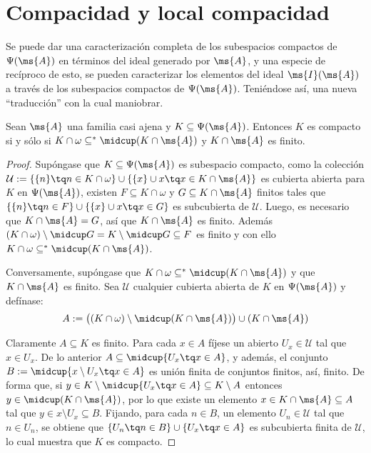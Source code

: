 	\section{Compacidad y local compacidad}
	
	Se puede dar una caracterización completa de los subespacios compactos de $\Psi(\ms{A})$ en términos del ideal generado por $\ms{A}$, y una especie de recíproco de esto, se pueden caracterizar los elementos del ideal $\ms{I}(\ms{A})$ a través de los subespacios compactos de $\Psi(\ms{A})$. Teniéndose así, una nueva ``traducción'' con la cual maniobrar.
	
	\begin{proposicion}\label{prop-Kcaract}
		Sean $\ms{A}$ una familia casi ajena y $K \subseteq \Psi(\ms{A})$. Entonces $K$ es compacto si y sólo si $K \cap \omega \subseteq^* \midcup (K \cap \ms{A})$ y $K \cap \ms{A}$ es finito.
	\end{proposicion}
	
	\begin{proof} 
		Supóngase que $K \subseteq \Psi(\ms{A})$ es subespacio compacto, como la colección $\mathcal{U}:=\{ \{n\} \tq n \in K \cap \omega \} \cup \{ \{x\} \cup x \tq x \in K \cap \ms{A} \}$ es cubierta abierta para $K$ en $\Psi(\ms{A})$, existen $F \subseteq K \cap \omega$ y $G \subseteq K \cap \ms{A}$ finitos tales que $\{ \{n\} \tq n \in F\} \cup \{ \{x\} \cup x \tq x \in G\}$ es subcubierta de $\mathcal{U}$. Luego, es necesario que $K \cap \ms{A} =G$, así que $K \cap \ms{A}$ es finito. Además $(K \cap \omega) \setminus \midcup G = K \setminus \midcup G \subseteq F$ es finito y con ello $K \cap \omega \subseteq^* \midcup (K \cap \ms{A})$.
		
		Conversamente, supóngase que $K \cap \omega \subseteq^* \midcup (K \cap \ms{A})$ y que $K \cap \ms{A}$ es finito. Sea $\mathcal{U}$ cualquier cubierta abierta de $K$ en $\Psi(\ms{A})$ y defínase:
		$$ A:=\big( (K\cap \omega) \setminus \midcup (K \cap \ms{A}) \big) \cup (K \cap \ms{A}) $$
		
		Claramente $A \subseteq K$ es finito. Para cada $x \in A$ fíjese un abierto $U_x \in \mathcal{U}$ tal que $x \in U_x$. De lo anterior $A \subseteq \midcup\{ U_x \tq x \in A\}$, y además, el conjunto $ B:=\midcup\{ x \setminus U_x \tq x \in A\}$ es unión finita de conjuntos finitos, así, finito. De forma que, si $y \in K \setminus \midcup\{ U_x \tq x \in A\} \subseteq K \setminus A$ entonces $y \in \midcup (K \cap \ms{A})$, por lo que existe un elemento $x \in K \cap \ms{A} \subseteq A$ tal que $y \in x \setminus U_x \subseteq B$. Fijando, para cada $n \in B$, un elemento $U_n \in \mathcal{U}$ tal que $n \in U_n$, se obtiene que $\{ U_n \tq n \in B\} \cup \{U_x \tq x \in A\}$ es subcubierta finita de $\mathcal{U}$, lo cual muestra que $K$ es compacto.
	\end{proof}	
	
